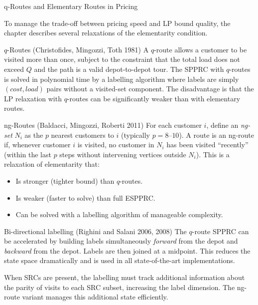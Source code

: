 \documentclass[aspectratio=169,10pt]{beamer}
\begin{document}
\begin{frame}[allowframebreaks]{q-Routes and Elementary Routes in Pricing}

To manage the trade-off between pricing speed and LP bound quality, the
chapter describes several relaxations of the elementarity condition.

\begin{block}{$q$-Routes (Christofides, Mingozzi, Toth 1981)}
A $q$-route allows a customer to be visited more than once, subject to
the constraint that the total load does not exceed $Q$ and the path is
a valid depot-to-depot tour. The SPPRC with $q$-routes is solved in
polynomial time by a labelling algorithm where labels are simply
$(cost, load)$ pairs without a visited-set component. The disadvantage
is that the LP relaxation with $q$-routes can be significantly weaker
than with elementary routes.
\end{block}

\begin{block}{ng-Routes (Baldacci, Mingozzi, Roberti 2011)}
For each customer $i$, define an \emph{ng-set} $N_i$ as the $p$ nearest
customers to $i$ (typically $p = 8$--$10$). A route is an ng-route if,
whenever customer $i$ is visited, no customer in $N_i$ has been visited
``recently'' (within the last $p$ steps without intervening vertices
outside $N_i$). This is a relaxation of elementarity that:
\begin{itemize}
  \item Is stronger (tighter bound) than $q$-routes.
  \item Is weaker (faster to solve) than full ESPPRC.
  \item Can be solved with a labelling algorithm of manageable complexity.
\end{itemize}
\end{block}

\framebreak

\begin{block}{Bi-directional labelling (Righini and Salani 2006, 2008)}
The $q$-route SPPRC can be accelerated by building labels simultaneously
\emph{forward} from the depot and \emph{backward} from the depot. Labels
are then joined at a midpoint. This reduces the state space dramatically
and is used in all state-of-the-art implementations.

When SRCs are present, the labelling must track additional information
about the parity of visits to each SRC subset, increasing the label
dimension. The ng-route variant manages this additional state efficiently.
\end{block}


\end{frame}
\end{document}
